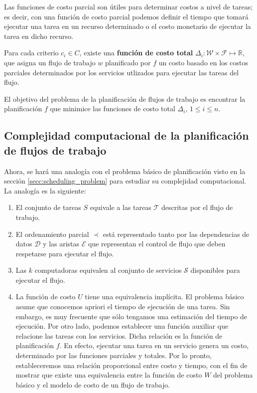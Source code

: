 Las funciones de costo parcial son útiles para determinar costos a nivel de tareas; es decir, con una función de costo parcial podemos definir el tiempo que tomará ejecutar una tarea en un recurso determinado o el costo monetario de ejecutar la tarea en dicho recurso.

\begin{defn}
Para cada criterio $c_i \in C$, existe una \textbf{función de costo total} $\Delta_i : \mathcal{W} \times \mathcal{F} \mapsto \mathbb{R}$, que asigna un flujo de trabajo $w$ planificado por $f$ un costo basado en los costos parciales determinados por los servicios utlizados para ejecutar las tareas del flujo.
\end{defn}

El objetivo del problema de la planificación de flujos de trabajo es encontrar la planificación $f$ que minimice las funciones de costo total $\Delta_i$, $1 \le i \le n$.

\subsection{Complejidad computacional de la planificación de flujos de trabajo}
Ahora, se hará una analogía con el problema básico de planificación visto en la sección \ref{secc:scheduling_problem} para estudiar su complejidad computacional. La analogía es la siguiente:


\begin{enumerate}
\item El conjunto de tareas $S$ equivale a las tareas $\mathcal{T}$ descritas por el flujo de trabajo.

\item El ordenamiento parcial $\prec$ está representado tanto por las dependencias de datos $\mathcal{D}$ y las aristas $\mathcal{E}$ que representan el control de flujo que deben respetarse para ejecutar el flujo.

\item Las $k$ computadoras equivalen al conjunto de servicios $\mathcal{S}$ disponibles para ejecutar el flujo.

\item La función de costo $U$ tiene una equivalencia implícita. El problema básico asume que conocemos apriori el tiempo de ejecución de una tarea. Sin embargo, es muy frecuente que sólo tengamos una estimación del tiempo de ejecución. Por otro lado, podemos establecer una función auxiliar que relacione las tareas con los servicios. Dicha relación es la función de planificación $f$. En efecto, ejecutar una tarea en un servicio genera un costo, determinado por las funciones parciales y totales. Por lo pronto, estableceremos una relación proporcional entre costo y tiempo, con el fin de mostrar que existe una equivalencia entre la función de costo $W$ del problema básico y el modelo de costo de un flujo de trabajo.
\end{enumerate}

